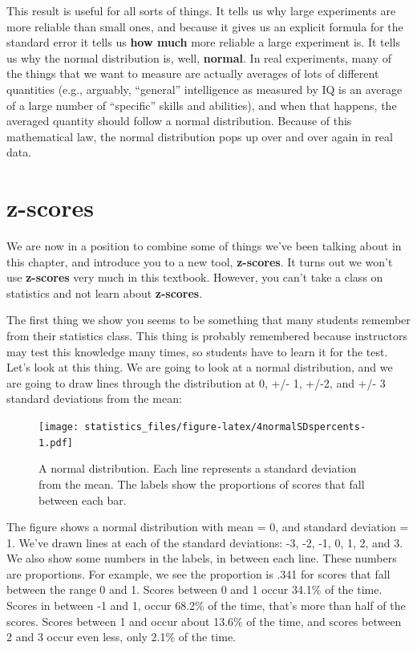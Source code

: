 \documentclass[]{book}
\begin{document}
This result is useful for all sorts of things. It tells us why large experiments are more reliable than small ones, and because it gives us an explicit formula for the standard error it tells us \textbf{how much} more reliable a large experiment is. It tells us why the normal distribution is, well, \textbf{normal}. In real experiments, many of the things that we want to measure are actually averages of lots of different quantities (e.g., arguably, ``general'' intelligence as measured by IQ is an average of a large number of ``specific'' skills and abilities), and when that happens, the averaged quantity should follow a normal distribution. Because of this mathematical law, the normal distribution pops up over and over again in real data.

\hypertarget{z-scores}{%
\section{z-scores}\label{z-scores}}

We are now in a position to combine some of things we've been talking about in this chapter, and introduce you to a new tool, \textbf{z-scores}. It turns out we won't use \textbf{z-scores} very much in this textbook. However, you can't take a class on statistics and not learn about \textbf{z-scores}.

The first thing we show you seems to be something that many students remember from their statistics class. This thing is probably remembered because instructors may test this knowledge many times, so students have to learn it for the test. Let's look at this thing. We are going to look at a normal distribution, and we are going to draw lines through the distribution at 0, +/- 1, +/-2, and +/- 3 standard deviations from the mean:

\begin{figure}
\centering
\texttt{[image: statistics\_files/figure-latex/4normalSDspercents-1.pdf]}
\caption{\label{fig:4normalSDspercents}A normal distribution. Each line represents a standard deviation from the mean. The labels show the proportions of scores that fall between each bar.}
\end{figure}

The figure shows a normal distribution with mean = 0, and standard deviation = 1. We've drawn lines at each of the standard deviations: -3, -2, -1, 0, 1, 2, and 3. We also show some numbers in the labels, in between each line. These numbers are proportions. For example, we see the proportion is .341 for scores that fall between the range 0 and 1. Scores between 0 and 1 occur 34.1\% of the time. Scores in between -1 and 1, occur 68.2\% of the time, that's more than half of the scores. Scores between 1 and occur about 13.6\% of the time, and scores between 2 and 3 occur even less, only 2.1\% of the time.
\end{document}

